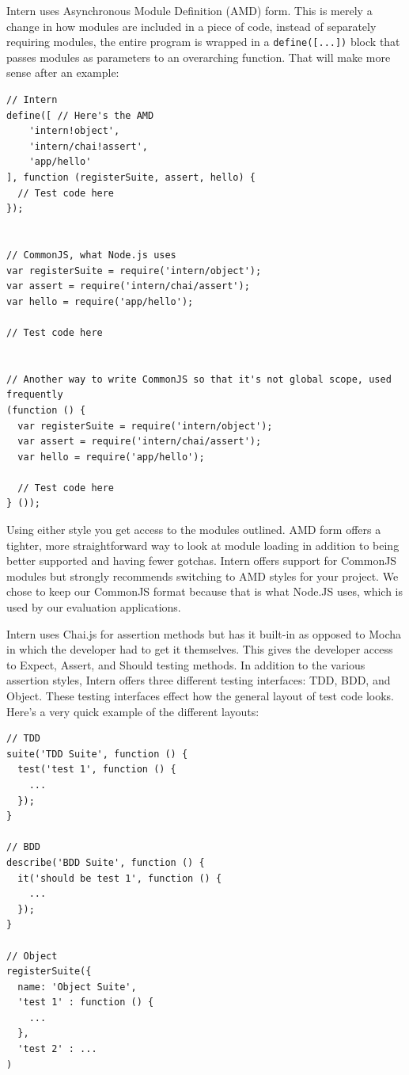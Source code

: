 \documentclass[12pt]{ucthesis}
\begin{document}
Intern uses Asynchronous Module Definition (AMD) form. This is merely a change in how modules are included in a piece of code, instead of separately requiring modules, the entire program is wrapped in a \lstinline{define([...])} block that passes modules as parameters to an overarching function. That will make more sense after an example:
\begin{lstlisting}
// Intern
define([ // Here's the AMD
    'intern!object',
    'intern/chai!assert',
    'app/hello'
], function (registerSuite, assert, hello) {
  // Test code here
});


// CommonJS, what Node.js uses 
var registerSuite = require('intern/object');
var assert = require('intern/chai/assert');
var hello = require('app/hello');

// Test code here


// Another way to write CommonJS so that it's not global scope, used frequently
(function () {
  var registerSuite = require('intern/object');
  var assert = require('intern/chai/assert');
  var hello = require('app/hello');

  // Test code here
} ());
\end{lstlisting}

Using either style you get access to the modules outlined. AMD form offers a tighter, more straightforward way to look at module loading in addition to being better supported and having fewer gotchas\cite{AMDInfo}. Intern offers support for CommonJS modules but strongly recommends switching to AMD styles for your project. We chose to keep our CommonJS format because that is what Node.JS uses, which is used by our evaluation applications.

Intern uses Chai.js for assertion methods but has it built-in as opposed to Mocha in which the developer had to get it themselves. This gives the developer access to Expect, Assert, and Should testing methods. In addition to the various assertion styles, Intern offers three different testing interfaces: TDD, BDD, and Object. These testing interfaces effect how the general layout of test code looks. Here's a very quick example of the different layouts:
\begin{lstlisting}
// TDD
suite('TDD Suite', function () {
  test('test 1', function () {
    ...
  });
}

// BDD
describe('BDD Suite', function () {
  it('should be test 1', function () {
    ...
  });
}

// Object
registerSuite({
  name: 'Object Suite', 
  'test 1' : function () {
    ...
  },
  'test 2' : ...
)
\end{lstlisting}
\end{document}
